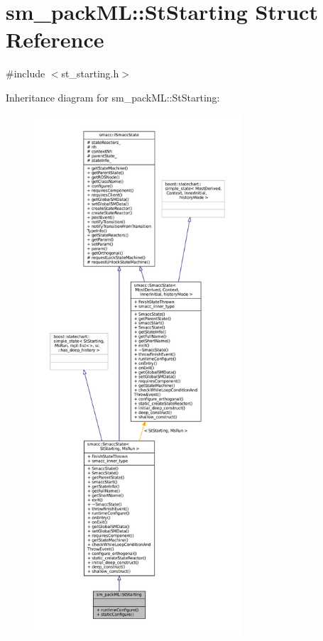 \hypertarget{structsm__packML_1_1StStarting}{}\section{sm\+\_\+pack\+ML\+:\+:St\+Starting Struct Reference}
\label{structsm__packML_1_1StStarting}


{\ttfamily \#include $<$st\+\_\+starting.\+h$>$}



Inheritance diagram for sm\+\_\+pack\+ML\+:\+:St\+Starting\+:
\nopagebreak
\begin{figure}[H]
\begin{center}
\leavevmode
\includegraphics[height=550pt]{structsm__packML_1_1StStarting__inherit__graph}
\end{center}
\end{figure}


